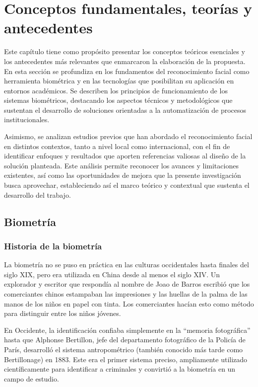 \fancyhead{}
\fancyfoot{}
\newtheorem{teorema}{Teorema}
\cfoot{\thepage}



\chapter{Conceptos fundamentales, teorías y antecedentes}

Este capítulo tiene como propósito presentar los conceptos teóricos esenciales y los antecedentes más relevantes que enmarcaron la elaboración de la propuesta. En esta sección se profundiza en los fundamentos del reconocimiento facial como herramienta biométrica y en las tecnologías que posibilitan su aplicación en entornos académicos. Se describen los principios de funcionamiento de los sistemas biométricos, destacando los aspectos técnicos y metodológicos que sustentan el desarrollo de soluciones orientadas a la automatización de procesos institucionales.

Asimismo, se analizan estudios previos que han abordado el reconocimiento facial en distintos contextos, tanto a nivel local como internacional, con el fin de identificar enfoques y resultados que aporten referencias valiosas al diseño de la solución planteada. Este análisis permite reconocer los avances y limitaciones existentes, así como las oportunidades de mejora que la presente investigación busca aprovechar, estableciendo así el marco teórico y contextual que sustenta el desarrollo del trabajo.\section{Biometría}
\subsection{Historia de la biometría}
La biometría no se puso en práctica en las culturas occidentales hasta finales del siglo XIX, pero era utilizada en China desde al menos el siglo XIV. Un explorador y escritor que respondía al nombre de Joao de Barros escribió que los comerciantes chinos estampaban las impresiones y las huellas de la palma de las manos de los niños en papel con tinta. Los comerciantes hacían esto como método para distinguir entre los niños jóvenes\cite{historiaReconocimiento}.

En Occidente, la identificación confiaba simplemente en la ``memoria fotográfica'' hasta que Alphonse Bertillon, jefe del departamento fotográfico de la Policía de París, desarrolló el sistema antropométrico (también conocido más tarde como Bertillonage) en 1883. Este era el primer sistema preciso, ampliamente utilizado científicamente para identificar a criminales y convirtió a la biometría en un campo de estudio\cite{historiaReconocimiento}.

